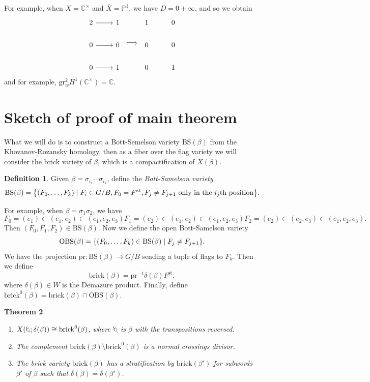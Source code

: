 \documentclass[leqno, openany]{memoir}
\newtheorem{thm}{Theorem}[section]
\theoremstyle{definition}
\newtheorem{defn}[thm]{Definition}
\theoremstyle{remark}
\theoremstyle{plain}
\theoremstyle{definition}
\theoremstyle{remark}
\newcommand{\C}{\mathbb{C}}
\renewcommand{\P}{\mathbb{P}}
\newcommand{\mr}[1]{\mathrm{#1}}
\newcommand{\ol}[1]{\overline{#1}}
\newcommand{\1}{\mathbf{1}}
\newcommand{\2}{\mathbf{2}}
\newcommand{\3}{\mathbf{3}}
\newcommand{\ateb}{\reflectbox{$\beta$}}
\begin{document}
For example, when $X = \C^{\times}$ and $\ol{X} = \P^1$, we have $D = 0 + \infty$, and so we obtain
\begin{equation*}
\begin{tikzcd}
    2 \ar{r} & 1 \\
    0 \ar{r} & 0 \\
    0 \ar{r} & 1 
\end{tikzcd} \implies
\begin{tikzcd}
    1 & 0 \\
    0 & 0 \\
    0 & 1 
\end{tikzcd}
\end{equation*}
and for example, $\mr{gr}_w^2 H^1(\C^{\times}) = \C$.

\section{Sketch of proof of main theorem}%
\label{sec:sketch_of_proof_of_main_theorem}

What we will do is to construct a Bott-Semelson variety $\mr{BS}(\beta)$ from the Khovanov-Rozansky homology, then as a fiber over the flag variety we will consider the brick variety of $\beta$, which is a compactification of $X(\beta)$.

\begin{defn}
    Given $\beta = \sigma_{i_1} \cdots \sigma_{i_k}$, define the \textit{Bott-Samelson variety}
    \[ \mr{BS}(\beta) = \qty{(F_0, \ldots, F_k) \mid F_i \in G/B, F_0 = F^{\mr{st}}, F_j \neq F_{j+1} \text{ only in the $i_j$th position}}. \]
\end{defn}

For example, when $\beta = \sigma_1 \sigma_2$, we have
\[ 
F_0 = (e_1) \subset (e_1, e_2) \subset (e_1, e_2, e_3)
F_1 = (e_2) \subset (e_1, e_2) \subset (e_1, e_2, e_3)
F_2 = (e_2) \subset (e_2, e_3) \subset (e_1, e_2, e_3).
\]
Then $(F_0, F_1, F_2) \in \mr{BS}(\beta)$. Now we define the open Bott-Samelson variety 
\[ \mr{OBS}(\beta) = \qty{(F_0, \ldots, F_k) \in \mr{BS}(\beta) \mid F_j \neq F_{j+1}}. \]
We have the projection $\mr{pr} \colon \mr{BS}(\beta) \to G/B$ sending a tuple of flags to $F_k$. Then we define
\[ \mr{brick}(\beta) = \mr{pr}^{-1} \delta(\beta) F^{\mr{st}}, \]
where $\delta(\beta) \in W$ is the Demazure product. Finally, define $\mr{brick}^0(\beta) = \mr{brick}(\beta) \cap \mr{OBS}(\beta)$.

\begin{thm}\leavevmode
    \begin{enumerate}
        \item $X(\ateb; \delta(\beta)) \cong \mr{brick}^0(\beta)$, where $\ateb$ is $\beta$ with the transpositions reversed.
        \item The complement $\mr{brick}(\beta) \setminus \mr{brick}^0(\beta)$ is a normal crossings divisor.
        \item The brick variety $\mr{brick}(\beta)$ has a stratification by $\mr{brick}(\beta')$ for subwords $\beta'$ of $\beta$ such that $\delta(\beta) = \delta(\beta')$.
    \end{enumerate}
\end{thm}
\end{document}
